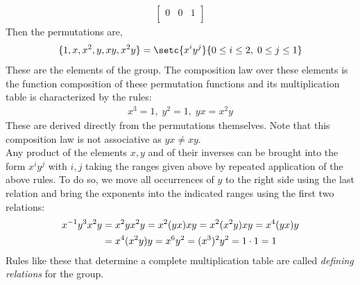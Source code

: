 \documentclass[MathsNotesBase.tex]{subfiles}
\begin{document}
{\begin{align*}
\begin{bmatrix}
			0 & 0 & 1 \\
			\end{bmatrix}
		\end{align*}
		Then the permutations are,
		\[ \{1, x, x^2, y, xy, x^2y\} = \setc{x^iy^j}{0 \leq i \leq 2,\; 0 \leq j \leq 1} \]
		These are the elements of the group. The composition law over these elements is the function composition of these permutation functions and its multiplication table is characterized by the rules:
		\begin{align*}
			x^3 = 1,\; y^2 = 1,\; yx = x^2y
		\end{align*}
		These are derived directly from the permutations themselves. Note that this composition law is not associative as $yx \neq xy$. \\
		Any product of the elements $x,y$ and of their inverses can be brought into the form $x^iy^j$ with $i,j$ taking the ranges given above by repeated application of the above rules. To do so, we move all occurrences of $y$  to the right side using the last relation and bring the exponents into the indicated ranges using the first two relations:
		\begin{align*} 
			{x}^{-1}y^3x^2y &= x^2yx^2y = x^2(yx)xy = x^2(x^2y)xy = x^4(yx)y\\
						&= x^4(x^2y)y = x^6y^2 = (x^3)^2y^2 = 1 \cdot 1 = 1
		\end{align*}
		Rules like these that determine a complete multiplication table are called \textit{defining relations} for the group.	
	}
	
\end{document}
